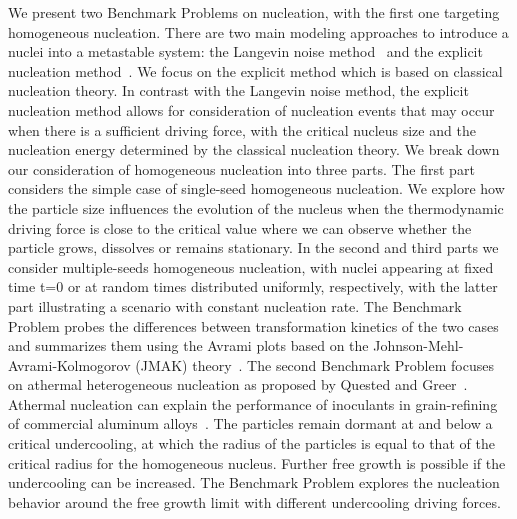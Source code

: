 \documentclass[preprint,12pt]{elsarticle}
\begin{document}
We present two Benchmark Problems on nucleation, with the first one targeting homogeneous nucleation. There are two main modeling approaches to introduce a
nuclei into a metastable system: the Langevin noise method~\cite{kubo1966, granasy2002nucleation} and the explicit nucleation method~\cite{simmons2000phase, shi2019}. We focus on the explicit method which is based on classical nucleation theory. In contrast with the Langevin noise method, the explicit nucleation method allows for consideration of nucleation events that may occur when there is a sufficient driving force, with the critical nucleus size and the nucleation energy determined by the classical nucleation theory. We break down our consideration of homogeneous nucleation into three parts. The first part considers the simple case of single-seed homogeneous nucleation. We explore how the particle size influences the evolution of the nucleus when the thermodynamic driving force is close to the critical value where we can observe whether the particle grows, dissolves or remains stationary. 
In the second and third parts we consider multiple-seeds homogeneous nucleation, with nuclei appearing at fixed time t=0 or at random times distributed uniformly, respectively, with the latter part illustrating a scenario with constant nucleation rate. The Benchmark Problem probes the differences between transformation kinetics of the two cases and summarizes them using the Avrami plots based on the Johnson-Mehl-Avrami-Kolmogorov (JMAK) theory~\cite{johnson1939reaction,avrami1939kinetics,avrami1940kinetics,avrami1941granulation,kolmogorov1937izv}. The second Benchmark Problem focuses on athermal heterogeneous nucleation as proposed by Quested and Greer~\cite{quested2005athermal}. Athermal nucleation can explain the performance of inoculants in grain-refining of commercial aluminum alloys~\cite{greer2000modelling,greer2016overview}. The particles remain dormant at and below a critical undercooling, at which the radius of the particles is equal to that of the critical radius for the homogeneous nucleus. Further free growth is possible if the undercooling can be increased. The Benchmark Problem explores the nucleation behavior around the free growth limit with different undercooling driving forces.
\end{document}
